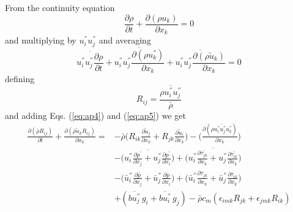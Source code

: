From the continuity equation 
\begin{equation}
  \frac{\partial \rho}{\partial t} + \frac{\partial (\rho u_k)}{\partial 
  x_k} = 0
\end{equation}
and multiplying by $u^{''}_i u^{''}_j$ and averaging
\begin{equation}
\label{eq:ap5}
  \overline{u^{''}_i u^{''}_j \frac{\partial \rho}{\partial t}} +
  \overline{u^{''}_i u^{''}_j \frac{\partial (\rho u^{''}_k)}{
      \partial x_k}} + \overline{u^{''}_i u^{''}_j \frac{\partial 
      (\rho \tilde{u}_k) }{\partial x_k} } = 0
\end{equation}
defining
\begin{equation}
  R_{ij} = \frac{\overline{\rho u^{''}_i u^{''}_j}}{\bar{\rho}}
\end{equation}
and adding Eqs. (\ref{eq:ap4}) and (\ref{eq:ap5}) we get
\begin{equation}
\begin{split}
  \frac{\partial (\bar{\rho} R_{ij})}{\partial t} +
  \frac{\partial (\bar{\rho} \tilde{u}_k R_{ij})}{\partial x_k} = 
  & -\bar{\rho}\biggl( R_{ik} \frac{\partial \tilde{u}_j}{\partial x_k} +
  R_{jk} \frac{\partial \tilde{u}_i}{\partial x_k} \biggr) -
  \biggl( \frac{\partial (\overline{\rho u^{''}_i u^{''}_j u^{''}_k}) }{
    \partial x_k} \biggr) \\
  & - \biggl( \overline{u^{''}_i \frac{\partial 
      p^{'}}{\partial x_j} + u^{''}_j \frac{\partial p^{'}}{\partial 
      x_i} } \biggr) + \biggl( \overline{u^{''}_i \frac{\partial 
      \tau^{'}_{jk}}{\partial x_k} + u^{''}_j \frac{\partial 
      \tau^{'}_{ik}}{\partial x_k}} \biggr) \\
  & - \biggl( \bar{u}^{''}_i 
  \frac{\partial \bar{p}}{\partial x_j} + \bar{u}^{''}_j \frac{\partial 
    \bar{p}}{ \partial x_i} \biggr) + \biggl( \bar{u}^{''}_i 
  \frac{\partial \bar{\tau}_{jk}}{\partial x_k} + \bar{u}^{''}_j 
  \frac{\partial \bar{\tau}_{ik}}{\partial x_k} \biggr) \\
  & + (\overline{bu^{''}_j}\,g_i+\overline{bu^{''}_i}\,g_j)
    - \bar{\rho}c_m(\epsilon_{imk} R_{jk} + \epsilon_{jmk} R_{ik} )
\end{split}
\end{equation}

